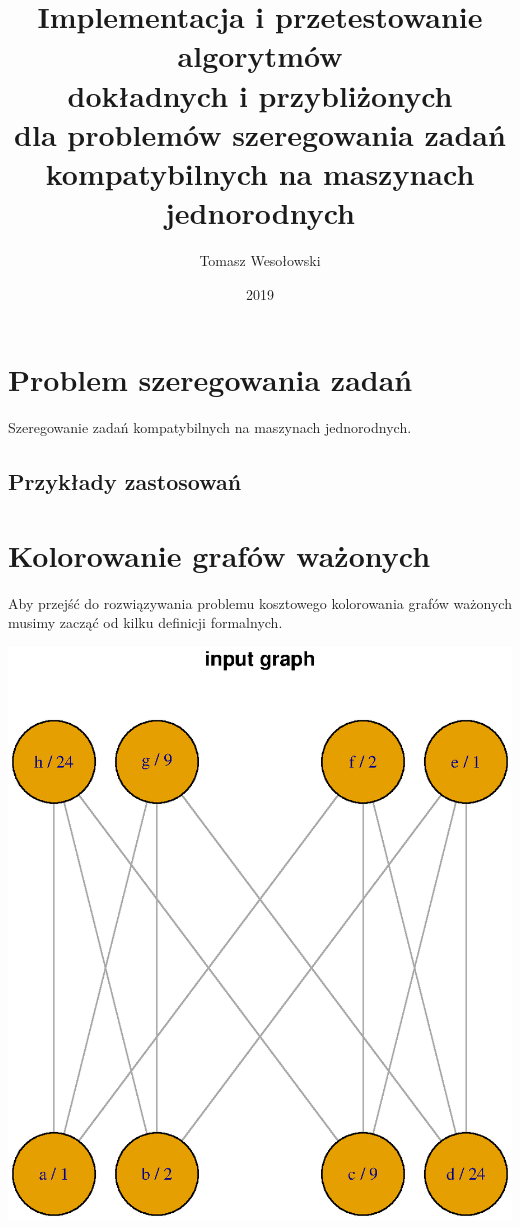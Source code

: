 \documentclass{article}
\title{%
	Implementacja i przetestowanie algorytmów \\
	dokładnych i przybliżonych \\
	dla problemów szeregowania zadań \\
	kompatybilnych na maszynach jednorodnych}
\author{Tomasz Wesołowski}
\date{2019}
\begin{document}
 
\maketitle
 
\tableofcontents
 
\section{Problem szeregowania zadań}

Szeregowanie zadań kompatybilnych na maszynach jednorodnych.

\subsection{Przykłady zastosowań}

\section{Kolorowanie grafów ważonych}

Aby przejść do rozwiązywania problemu kosztowego kolorowania grafów ważonych musimy zacząć od kilku definicji formalnych. 

\includegraphics[scale=0.6]{graphs/reference_graph.eps}
\end{document}
